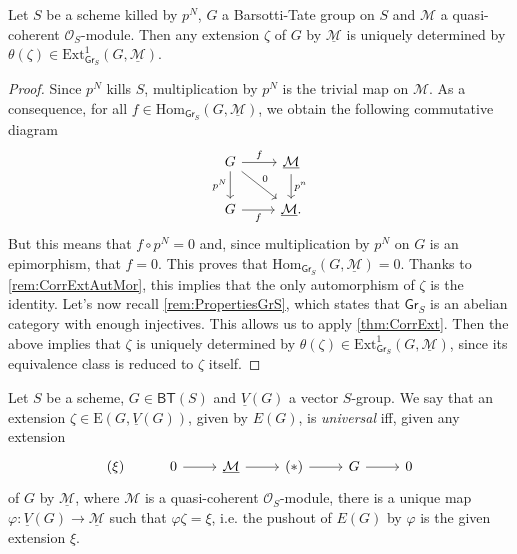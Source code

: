 \begin{lem}\label{lem:rigidityExt}
	Let $S$ be a scheme killed by $p^N$, $G$ a Barsotti-Tate group on $S$
	and $\mathcal{M}$ a quasi-coherent $\mathcal{O}_S$-module.
	Then any extension $\zeta$ of $G$ by $\underline{\mathcal{M}}$ is
	uniquely determined by $\theta(\zeta) \in 
	\mathrm{Ext}^1_{\mathsf{Gr}_S}(G, \underline{\mathcal{M}})$.
\end{lem} 
\begin{proof}
	Since $p^N$ kills $S$, multiplication by $p^N$ 
	is the trivial map on $\mathcal{M}$.
	As a consequence, for all $f \in \mathrm{Hom}_{\mathsf{Gr}_S}
	\left( G, \underline{\mathcal{M}} \right)$,
	we obtain the following commutative diagram
	\begin{equation*}
	\begin{tikzcd}
		G \arrow[r, "f", rightarrow] 
		\arrow[d, "p^N"', rightarrow] 
		\arrow[rd, "0", rightarrow] &
		\underline{\mathcal{M}} \arrow[d, "p^n", rightarrow] \\
		G \arrow[r, "f"', rightarrow] &
		\underline{\mathcal{M}}
	.\end{tikzcd}
	\end{equation*}
	But this means that $f \circ p^N = 0$ and, since multiplication
	by $p^N$ on $G$ is an epimorphism, that $f = 0$.
	This proves that $\mathrm{Hom}_{ \mathsf{Gr}_S } \left( G, \underline{\mathcal{M}} \right) = 0$.
	Thanks to \cref{rem:CorrExtAutMor}, this implies that
	the only automorphism of $\zeta$ is the identity.
	Let's now recall \cref{rem:PropertiesGrS},
	which states that $\mathsf{Gr}_S$ is an abelian category with enough injectives.
	This allows us to apply \cref{thm:CorrExt}.
	Then the above implies that $\zeta$ is uniquely determined by $\theta(\zeta)
	\in \mathrm{Ext}^1_{\mathsf{Gr}_S}(G, \underline{\mathcal{M}})$,
	since its equivalence class is reduced to $\zeta$ itself.
\end{proof}


\begin{defn}
	Let $S$ be a scheme, $G \in \mathsf{BT}(S)$
	and $\underline{V}(G)$ a vector $S$-group.
	We say that an extension $\zeta \in \mathrm{E}(G, \underline{V}(G))$, given
	by $E(G)$, is {\em universal} iff, given any extension
	\begin{equation*}
	\begin{tikzcd}
		(\xi) &
		0 \arrow[r, "", rightarrow] &
		\underline{\mathcal{M}} \arrow[r, "", rightarrow] &
		(*) \arrow[r, "", rightarrow] &
		G \arrow[r, "", rightarrow] &
		0
	\end{tikzcd}
	\end{equation*}
	of $G$ by $\underline{\mathcal{M}}$, where $\mathcal{M}$ is a quasi-coherent
	$\mathcal{O}_{ S }$-module,
	there is a unique map $\varphi\colon \underline{V}(G) \to \underline{\mathcal{M}}$
	such that $\varphi\zeta = \xi$, i.e.
	the pushout of $E(G)$ by $\varphi$ is the given
	extension $\xi$.
\end{defn}


